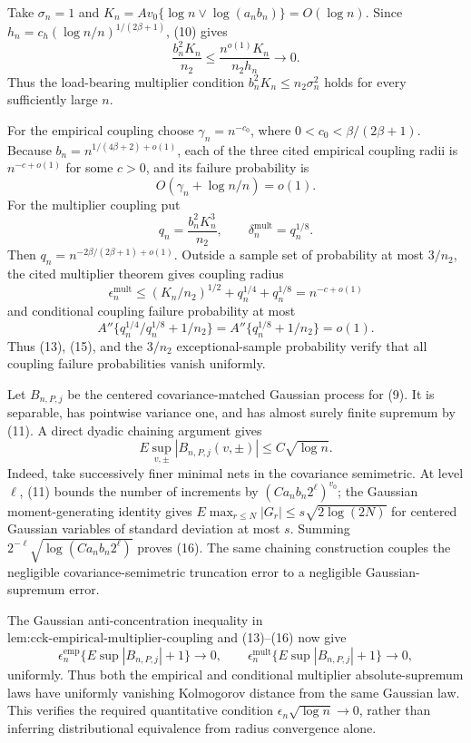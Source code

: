 Take \(\sigma_n=1\) and \(K_n=Av_0\{\log n\vee\log(a_nb_n)\}=O(\log n)\). Since \(h_n=c_h(\log n/n)^{1/(2\beta+1)}\), (10) gives
\[
 \frac{b_n^2K_n}{n_2}
 \le\frac{n^{o(1)}K_n}{n_2h_n}\longrightarrow0. \tag{12}
\]
Thus the load-bearing multiplier condition \(b_n^2K_n\le n_2\sigma_n^2\) holds for every sufficiently large \(n\).

For the empirical coupling choose \(\gamma_n=n^{-c_0}\), where \(0<c_0<\beta/(2\beta+1)\). Because \(b_n=n^{1/(4\beta+2)+o(1)}\), each of the three cited empirical coupling radii is \(n^{-c+o(1)}\) for some \(c>0\), and its failure probability is
\[
 O(\gamma_n+\log n/n)=o(1). \tag{13}
\]
For the multiplier coupling put
\[
 q_n=\frac{b_n^2K_n^3}{n_2},
 \qquad \delta_n^{\mathrm{mult}}=q_n^{1/8}.
\]
Then \(q_n=n^{-2\beta/(2\beta+1)+o(1)}\). Outside a sample set of probability at most \(3/n_2\), the cited multiplier theorem gives coupling radius
\[
 \epsilon_n^{\mathrm{mult}}
 \le (K_n/n_2)^{1/2}+q_n^{1/4}+q_n^{1/8}
 =n^{-c+o(1)} \tag{14}
\]
and conditional coupling failure probability at most
\[
 A''\{q_n^{1/4}/q_n^{1/8}+1/n_2\}
 =A''\{q_n^{1/8}+1/n_2\}=o(1). \tag{15}
\]
Thus (13), (15), and the \(3/n_2\) exceptional-sample probability verify that all coupling failure probabilities vanish uniformly.

Let \(B_{n,P,j}\) be the centered covariance-matched Gaussian process for (9). It is separable, has pointwise variance one, and has almost surely finite supremum by (11). A direct dyadic chaining argument gives
\[
 E\sup_{v,\pm}|B_{n,P,j}(v,\pm)|\le C\sqrt{\log n}. \tag{16}
\]
Indeed, take successively finer minimal nets in the covariance semimetric. At level \(\ell\), (11) bounds the number of increments by \((Ca_nb_n2^\ell)^{v_0}\); the Gaussian moment-generating identity gives \(E\max_{r\le N}|G_r|\le s\sqrt{2\log(2N)}\) for centered Gaussian variables of standard deviation at most \(s\). Summing \(2^{-\ell}\sqrt{\log(Ca_nb_n2^\ell)}\) proves (16). The same chaining construction couples the negligible covariance-semimetric truncation error to a negligible Gaussian-supremum error.

The Gaussian anti-concentration inequality in \(\text{lem:cck-empirical-multiplier-coupling}\) and (13)--(16) now give
\[
 \epsilon_n^{\mathrm{emp}}\{E\sup|B_{n,P,j}|+1\}\to0,
 \qquad
 \epsilon_n^{\mathrm{mult}}\{E\sup|B_{n,P,j}|+1\}\to0, \tag{17}
\]
uniformly. Thus both the empirical and conditional multiplier absolute-supremum laws have uniformly vanishing Kolmogorov distance from the same Gaussian law. This verifies the required quantitative condition \(\epsilon_n\sqrt{\log n}\to0\), rather than inferring distributional equivalence from radius convergence alone.


